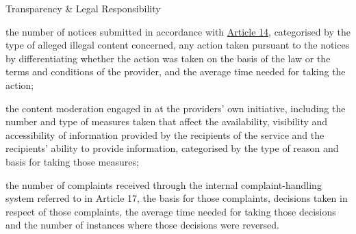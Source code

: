 \documentclass[nobackground,dvipsnames,table]{beamer}
\begin{document}
\begin{frame}{Transparency \& Legal Responsibility}
{\begin{itemize}
{    \item[] the number of notices submitted in accordance with \href{https://digitalservicesact.cc/dsa/art14.html}{Article 14}, categorised by the type of alleged illegal content concerned, any action taken pursuant to the notices by differentiating whether the action was taken on the basis of the law or the terms and conditions of the provider, and the average time needed for taking the action;
    
    \item[] the content moderation engaged in at the providers’ own initiative, including the number and type of measures taken that affect the availability, visibility and accessibility of information provided by the recipients of the service and the recipients’ ability to provide information, categorised by the type of reason and basis for taking those measures;
    
    \item[] the number of complaints received through the internal complaint-handling system referred to in Article 17, the basis for those complaints, decisions taken in respect of those complaints, the average time needed for taking those decisions and the number of instances where those decisions were reversed.
    }
\end{itemize}
}
\end{frame}
\end{document}
